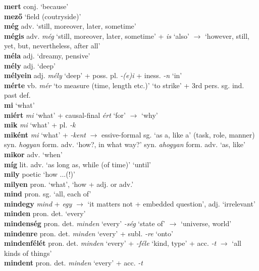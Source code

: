 \documentclass[11pt]{article}
\begin{document}
\textbf{mert} conj. `because' \\
\textbf{mező} `field (coutryside)' \\
\textbf{még} adv. `still, moreover, later, sometime' \\
\textbf{mégis} adv. \emph{még} `still, moreover, later, sometime'
+ \emph{is} `also' $\rightarrow$ `however, still, yet, but,
nevertheless, after all' \\
\textbf{méla} adj. `dreamy, pensive' \\
\textbf{mély} adj. `deep' \\
\textbf{mélyein} adj. \emph{mély} `deep' + poss. pl. \emph{-(e)i} +
iness. \emph{-n} `in' \\
\textbf{mérte} vb. \emph{mér} `to measure (time, length
etc.)' \textbar\textbar{} `to strike' + 3rd pers. sg. ind. past def. \\
\textbf{mi} `what' \\
\textbf{miért} \emph{mi} `what' + causal\hyp{}final \emph{ért} `for'
$\rightarrow$ `why' \\
\textbf{mik} \emph{mi} `what' + pl. \emph{-k} \\
\textbf{miként} \emph{mi} `what' + \emph{-kent} $\rightarrow$
essive\hyp{}formal sg. `as a, like a' (task, role,
manner) \textbar\textbar{} syn. \emph{hogyan} form. adv. `how?, in what way?' \textbar\textbar{} syn. \emph{ahogyan} form. adv. `as, like' \\
\textbf{mikor} adv. `when' \\
\textbf{míg} lit. adv. `as long as, while (of
time)' \textbar\textbar{} `until' \\
\textbf{mily} poetic `how ...(!)' \\
\textbf{milyen} pron. `what', `how + adj. or adv.' \\
\textbf{mind} pron. sg. `all, each of' \\
\textbf{mindegy} \emph{mind} + \emph{egy} $\rightarrow$ `it matters not
+ embedded question', adj. `irrelevant' \\
\textbf{minden} pron. det. `every' \\
\textbf{mindenség} pron. det. \emph{minden} `every' \emph{-ség}
`state of' $\rightarrow$ `universe, world' \\
\textbf{mindenre} pron. det. \emph{minden} `every' + subl. \emph{-re}
`onto' \\
\textbf{mindenfélét} pron. det. \emph{minden} `every' + \emph{-féle}
`kind, type' + acc. \emph{-t} $\rightarrow$ `all kinds of things' \\
\textbf{mindent} pron. det. \emph{minden} `every' + acc. \emph{-t}
\end{document}
